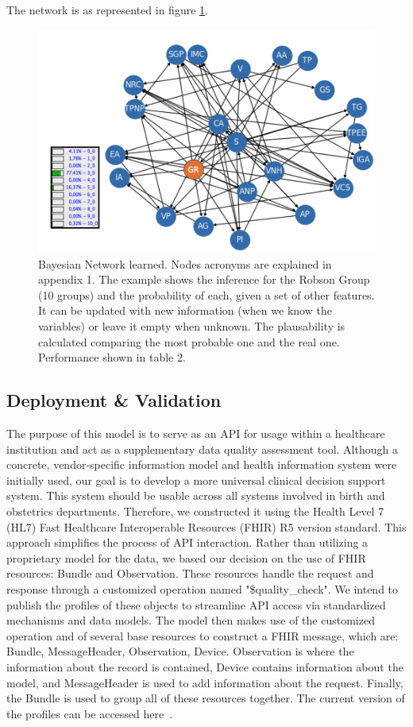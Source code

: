 The network is as represented in figure \ref{fig:network}.
\begin{figure}[htbp]
\centering
\caption{Bayesian Network learned. Nodes acronyms are explained in appendix 1. The example shows the inference for the Robson Group (10 groups) and the probability of each, given a set of other features. It can be updated with new information (when we know the variables) or leave it empty when unknown. The plausability is calculated comparing the most probable one and the real one. Performance shown in table 2.}\label{fig:network} 
\includegraphics[scale=0.38]{figures/new-bn.png}
\end{figure}



\subsection{Deployment \& Validation}

The purpose of this model is to serve as an API for usage within a healthcare institution and act as a supplementary data quality assessment tool. Although a concrete, vendor-specific information model and health information system were initially used, our goal is to develop a more universal clinical decision support system. This system should be usable across all systems involved in birth and obstetrics departments. Therefore, we constructed it using the Health Level 7 (HL7) Fast Healthcare Interoperable Resources (FHIR) R5 version standard. This approach simplifies the process of API interaction. Rather than utilizing a proprietary model for the data, we based our decision on the use of FHIR resources: Bundle and Observation. These resources handle the request and response through a customized operation named "\$quality\_check". We intend to publish the profiles of these objects to streamline API access via standardized mechanisms and data models. The model then makes use of the customized operation and of several base resources to construct a FHIR message, which are: Bundle, MessageHeader, Observation, Device. Observation is where the information about the record is contained, Device contains information about the model, and MessageHeader is used to add information about the request. Finally, the Bundle is used to group all of these resources together. The current version of the profiles can be accessed here\unskip~\cite{obs-ig}. 

